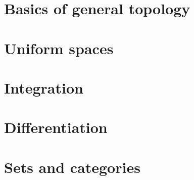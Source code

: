 \documentclass[11pt,fleqn]{book} %
\begin{document}
\chapter{Basics of general topology}




\chapter{Uniform spaces}\label{chp5}




\chapter{Integration}\label{chp5xx}




\chapter{Differentiation}\label{chp5x}




\appendix

\chapter{Sets and categories}








\cleardoublepage
{}
\setlength{\columnsep}{0.75cm}
\printindex
\printindex[notation]

\end{document}
